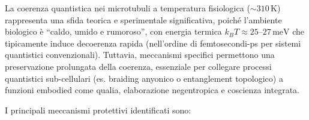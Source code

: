 \documentclass[11pt,a4paper]{article}
\theoremstyle{plain}
\theoremstyle{definition}
\begin{document}
\vspace{0.6cm}

La coerenza quantistica nei microtubuli a temperatura fisiologica ($\sim 310\,\mathrm{K}$) rappresenta una sfida teorica e sperimentale significativa, poiché l'ambiente biologico è ``caldo, umido e rumoroso'', con energia termica $k_B T \approx 25$--$27\,\mathrm{meV}$ che tipicamente induce decoerenza rapida (nell'ordine di femtosecondi-ps per sistemi quantistici convenzionali). Tuttavia, meccanismi specifici permettono una preservazione prolungata della coerenza, essenziale per collegare processi quantistici sub-cellulari (es. braiding anyonico o entanglement topologico) a funzioni embodied come qualia, elaborazione negentropica e coscienza integrata.

\vspace{0.5cm}

I principali meccanismi protettivi identificati sono:
\end{document}
